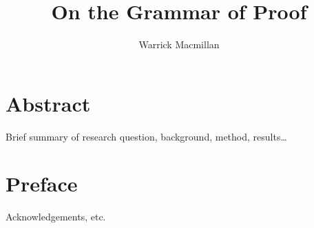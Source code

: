 \documentclass[11pt, a4paper]{article}
\title{On the Grammar of Proof}
\author{Warrick Macmillan}
\begin{document}
\begin{titlepage}

\maketitle
\thispagestyle{empty}
\end{titlepage}

\newpage
\singlespacing
\section*{Abstract}

Brief summary of research question, background, method, results\ldots

\thispagestyle{empty}

\newpage
\section*{Preface}

Acknowledgements, etc.

\thispagestyle{empty}

\newpage

\begin{spacing}{0.0}
\tableofcontents
\end{spacing}

\thispagestyle{empty}

\newpage
\setcounter{page}{1}

\begin{code}[hide]%
\>[0]\AgdaSymbol{\{-\#}\AgdaSpace{}%
\AgdaSpace{}%
\AgdaSpace{}%
\AgdaSymbol{\#-\}}\<%
\\
%
\\[\AgdaEmptyExtraSkip]%
\>[0]\AgdaSpace{}%
\AgdaSpace{}%
\<%
\end{code}
\end{document}
